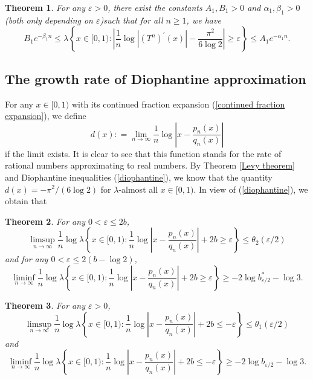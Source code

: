 \documentclass[reqno]{amsart}
\newtheorem{theorem}{Theorem}[section]
\theoremstyle{definition}
\numberwithin{equation}{section}
\begin{document}
\begin{theorem}
For any $\varepsilon > 0$, there exist the constants $A_1, B_1> 0$ and $\alpha_1, \beta_1 > 0$ (both only depending on $\varepsilon$)such that for all $n \geq 1$, we have
\begin{equation*}
B_1e^{-\beta_1 n} \leq \lambda \left\{x \in [0,1): \left|\frac{1}{n}\log |(T^n)^{\prime}(x)| - \frac{\pi^2}{6\log2}\right| \geq \varepsilon\right\} \leq A_1e^{-\alpha_1 n}.
\end{equation*}
\end{theorem}

\subsection{The growth rate of Diophantine approximation}
For any $x \in [0,1)$ with its continued fraction expansion (\ref{continued fraction expansion}), we define
\[
d(x): = \lim\limits_{n \to \infty}\frac{1}{n}\log \left|x - \frac{p_n(x)}{q_n(x)}\right|
\]
if the limit exists. It is clear to see that this function stands for the rate of rational numbers approximating to real numbers. By Theorem \ref{Levy theorem} and Diophantine inequalities (\ref{diophantine}), we know that the quantity $d(x)= -\pi^2/(6\log2)$ for $\lambda$-almost all $x \in [0,1)$. In view of (\ref{diophantine}), we obtain that
\begin{theorem}
For any $0< \varepsilon\leq 2b $,
\begin{equation*}
\limsup_{n \to \infty} \frac{1}{n}\log \lambda\left\{x\in [0,1):\frac{1}{n}\log \left|x - \frac{p_n(x)}{q_n(x)}\right| +2b \geq \varepsilon\right\} \leq \theta_2(\varepsilon/2)
\end{equation*}
 and for any $0< \varepsilon\leq 2(b-\log 2)$,
\begin{equation*}
\liminf_{n \to \infty} \frac{1}{n}\log \lambda\left\{x\in [0,1):\frac{1}{n}\log \left|x - \frac{p_n(x)}{q_n(x)}\right| + 2b \geq \varepsilon\right\} \geq -2\log b^\ast_{\varepsilon/2}-\log 3.
\end{equation*}
\end{theorem}

\begin{theorem}
For any $\varepsilon>0$,
\begin{equation*}
\limsup_{n \to \infty} \frac{1}{n}\log \lambda\left\{x\in [0,1):\frac{1}{n}\log \left|x - \frac{p_n(x)}{q_n(x)}\right| + 2b \leq -\varepsilon\right\} \leq \theta_1(\varepsilon/2)
\end{equation*}
and
\begin{equation*}
\liminf_{n \to \infty} \frac{1}{n}\log \lambda\left\{x\in [0,1):\frac{1}{n}\log \left|x - \frac{p_n(x)}{q_n(x)}\right| + 2b \leq -\varepsilon\right\} \geq -2\log b_{\varepsilon/2}-\log 3.
\end{equation*}
\end{theorem}
\end{document}

